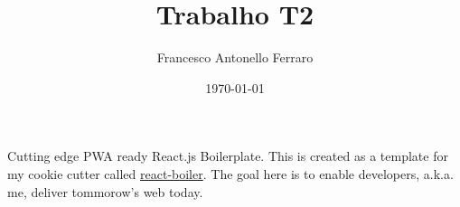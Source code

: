 \documentclass[11pt]{article}
\author{Francesco Antonello Ferraro}
\date{\today}
\title{Trabalho T2}
\begin{document}
\maketitle
\tableofcontents

Cutting edge PWA ready React.js Boilerplate. 
This is created as a template for my cookie cutter called \href{http://github.com/cescoferraro/react-boiler}{react-boiler}.
The goal here is to enable developers, a.k.a. me, deliver tommorow's web today.
\end{document}
